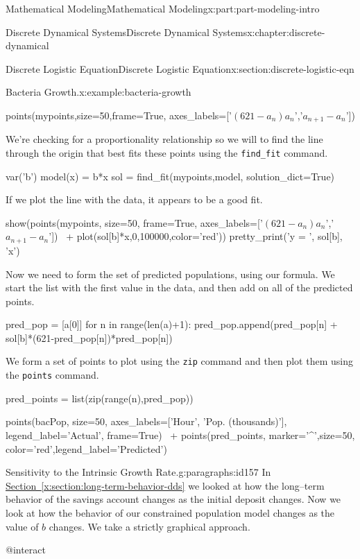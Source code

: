 \documentclass[oneside,10pt,]{book}
\newcommand{\xreffont}{\relax}
\newcommand{\mono}[1]{\texttt{#1}}
\numberwithin{equation}{section}
\begin{document}
\begin{partptx}{Mathematical Modeling}{}{Mathematical Modeling}{}{}{x:part:part-modeling-intro}
\begin{chapterptx}{Discrete Dynamical Systems}{}{Discrete Dynamical Systems}{}{}{x:chapter:discrete-dynamical}
\begin{sectionptx}{Discrete Logistic Equation}{}{Discrete Logistic Equation}{}{}{x:section:discrete-logistic-eqn}
\begin{example}{Bacteria Growth.}{x:example:bacteria-growth}
\begin{sageinput}
points(mypoints,size=50,frame=True,
	axes_labels=['$(621-a_n)a_n$','$a_{n+1}-a_n$'])
\end{sageinput}
We're checking for a proportionality relationship so we will to find the line through the origin that best fits these points using the \mono{find\_fit} command.%
\begin{sageinput}
var('b')
model(x) = b*x
sol = find_fit(mypoints,model, solution_dict=True)
\end{sageinput}
If we plot the line with the data, it appears to be a good fit.%
\begin{sageinput}
show(points(mypoints, size=50, frame=True,
axes_labels=['$(621-a_n)a_n$','$a_{n+1}-a_n$']) \
+ plot(sol[b]*x,0,100000,color='red'))
pretty_print('y = ', sol[b], 'x')
\end{sageinput}
Now we need to form the set of predicted populations, using our formula. We start the list with the first value in the data, and then add on all of the predicted points.%
\begin{sageinput}
pred_pop = [a[0]]
for n in range(len(a)+1):
    pred_pop.append(pred_pop[n] + 
    sol[b]*(621-pred_pop[n])*pred_pop[n])
\end{sageinput}
We form a set of points to plot using the \mono{zip} command and then plot them using the \mono{points} command.%
\begin{sageinput}
pred_points = list(zip(range(n),pred_pop))

points(bacPop, size=50, 
    axes_labels=['Hour', 'Pop. (thousands)'], 
    legend_label='Actual', frame=True) \
+ points(pred_points, marker='^',size=50, 
color='red',legend_label='Predicted')
\end{sageinput}
\begin{paragraphs}{Sensitivity to the Intrinsic Growth Rate.}{g:paragraphs:id157}%
In \hyperref[x:section:long-term-behavior-dds]{Section~{\xreffont\ref{x:section:long-term-behavior-dds}}} we looked at how the long–term behavior of the savings account changes as the initial deposit changes. Now we look at how the behavior of our constrained population model changes as the value of \(b\) changes. We take a strictly graphical approach.%
\end{paragraphs}%
\begin{sageinput}
@interact


\end{sageinput}
\end{example}
\end{sectionptx}
\end{chapterptx}
\end{partptx}
\end{document}
